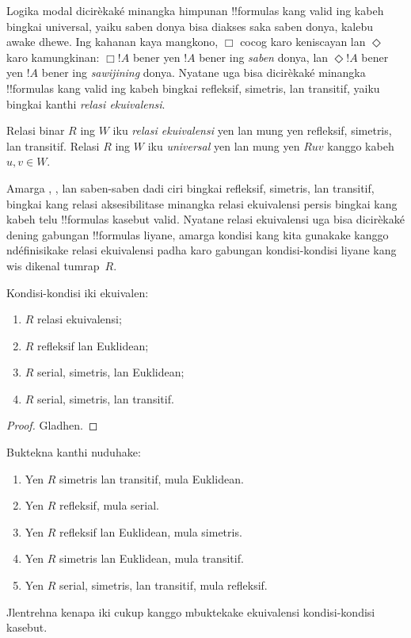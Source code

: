 \documentclass[../../../include/open-logic-section]{subfiles}
\begin{document}


Logika modal  dicirèkaké minangka himpunan
!!{formula}s kang valid ing kabeh bingkai universal, yaiku saben
donya bisa diakses saka saben donya, kalebu awake dhewe. Ing kahanan
kaya mangkono, $\Box$ cocog karo keniscayan lan $\Diamond$ karo
kamungkinan: $\Box !A$ bener yen $!A$ bener ing \emph{saben} donya,
lan $\Diamond !A$ bener yen $!A$ bener ing \emph{sawijining} donya.
Nyatane  uga bisa dicirèkaké minangka !!{formula}s kang valid
ing kabeh bingkai refleksif, simetris, lan transitif, yaiku bingkai
kanthi \emph{relasi ekuivalensi}.

\begin{defn}
  Relasi binar $R$ ing $W$ iku \emph{relasi ekuivalensi} yen lan mung yen
  refleksif, simetris, lan transitif. Relasi $R$ ing $W$ iku
  \emph{universal} yen lan mung yen $Ruv$ kanggo kabeh $u,v \in W$.
\end{defn}

Amarga , , lan  saben-saben dadi ciri
bingkai refleksif, simetris, lan transitif, bingkai kang relasi
aksesibilitase minangka relasi ekuivalensi persis bingkai kang kabeh
telu !!{formula}s kasebut valid. Nyatane relasi ekuivalensi uga bisa
dicirèkaké dening gabungan !!{formula}s liyane, amarga kondisi kang
kita gunakake kanggo ndéfinisikake relasi ekuivalensi padha karo
gabungan kondisi-kondisi liyane kang wis dikenal tumrap~$R$.

\begin{prop}
  Kondisi-kondisi iki ekuivalen:
  \begin{enumerate}
  \item $R$ relasi ekuivalensi;
  \item $R$ refleksif lan Euklidean;
  \item $R$ serial, simetris, lan Euklidean;
  \item $R$ serial, simetris, lan transitif.
  \end{enumerate}
\end{prop}

\begin{proof}
  Gladhen.
\end{proof}

\begin{prob}
  Buktekna  kanthi nuduhake:
  \begin{enumerate}
  \item Yen $R$ simetris lan transitif, mula Euklidean.
  \item Yen $R$ refleksif, mula serial.
  \item Yen $R$ refleksif lan Euklidean, mula simetris.
  \item Yen $R$ simetris lan Euklidean, mula transitif.
  \item Yen $R$ serial, simetris, lan transitif, mula refleksif.
  \end{enumerate}
  Jlentrehna kenapa iki cukup kanggo mbuktekake ekuivalensi
  kondisi-kondisi kasebut.
\end{prob}
\end{document}
